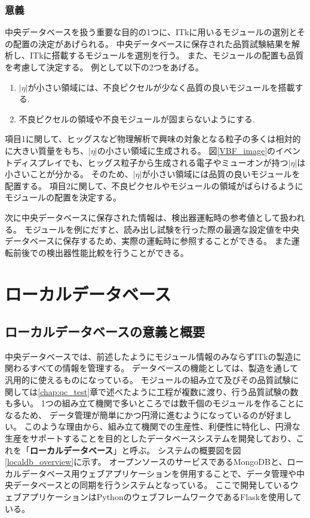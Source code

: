 \subsubsection{意義}
中央データベースを扱う重要な目的の1つに、ITkに用いるモジュールの選別とその配置の決定があげられる。
中央データベースに保存された品質試験結果を解析し、ITkに搭載するモジュールを選別を行う。
また、モジュールの配置も品質を考慮して決定する。
例として以下の2つをあげる。
\begin{enumerate}
  \item $|\eta|$が小さい領域には、不良ピクセルが少なく品質の良いモジュールを搭載する.
  \item 不良ピクセルの領域や不良モジュールが固まらないようにする.
\end{enumerate}
項目1に関して、ヒッグスなど物理解析で興味の対象となる粒子の多くは相対的に大きい質量をもち、$|\eta|$の小さい領域に生成される。
図\ref{VBF_image}のイベントディスプレイでも、ヒッグス粒子から生成される電子やミューオンが持つ$|\eta|$は小さいことが分かる。
そのため、$|\eta|$が小さい領域には品質の良いモジュールを配置する。
項目2に関して、不良ピクセルやモジュールの領域がばらけるようにモジュールの配置を決定する。


次に中央データベースに保存された情報は、検出器運転時の参考値として扱われる。
モジュールを例にだすと、読み出し試験を行った際の最適な設定値を中央データベースに保存するため、実際の運転時に参照することができる。
また運転前後での検出器性能比較を行うことができる。

\section{ローカルデータベース}
\subsection{ローカルデータベースの意義と概要}
中央データベースでは、前述したようにモジュール情報のみならずITkの製造に関わるすべての情報を管理する。
データベースの機能としては、製造を通して汎用的に使えるものになっている。
モジュールの組み立て及びその品質試験に関しては\ref{chap:qc_test}章で述べたように工程が複数に渡り、行う品質試験の数も多い。
1つの組み立て機関で多いところでは数千個のモジュールを作ることになるため、
データ管理が簡単にかつ円滑に進むようになっているのが好ましい。
このような理由から、組み立て機関での生産性、利便性に特化し、円滑な生産をサポートすることを目的としたデータベースシステムを開発しており、これを「\textbf{ローカルデータベース}」と呼ぶ。
システムの概要図を図\ref{localdb_overview}に示す。
オープンソースのサービスであるMongoDB\cite{4-1}と、ローカルデータベース用ウェブアプリケーションを併用することで、データ管理や中央データベースとの同期を行うシステムとなっている。
ここで開発しているウェブアプリケーションはPythonのウェブフレームワークであるFlask\cite{4-3}を使用している。


